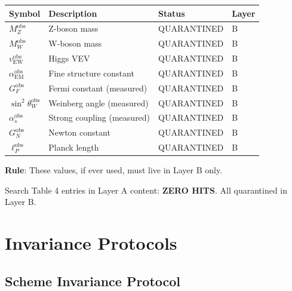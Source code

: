\documentclass[11pt,a4paper]{article}
\begin{document}
\begin{forbiddenbox}
\label{box:table-external}
\begin{center}
\begin{tabular}{llll}
\toprule
\textbf{Symbol} & \textbf{Description} & \textbf{Status} & \textbf{Layer} \\
\midrule
$M_Z^{\text{obs}}$ & Z-boson mass & QUARANTINED & B \\
$M_W^{\text{obs}}$ & W-boson mass & QUARANTINED & B \\
$v_{\text{EW}}^{\text{obs}}$ & Higgs VEV & QUARANTINED & B \\
$\alpha_{\text{EM}}^{\text{obs}}$ & Fine structure constant & QUARANTINED & B \\
$G_F^{\text{obs}}$ & Fermi constant (measured) & QUARANTINED & B \\
$\sin^2\theta_W^{\text{obs}}$ & Weinberg angle (measured) & QUARANTINED & B \\
$\alpha_s^{\text{obs}}$ & Strong coupling (measured) & QUARANTINED & B \\
$G_N^{\text{obs}}$ & Newton constant & QUARANTINED & B \\
$\ell_P^{\text{obs}}$ & Planck length & QUARANTINED & B \\
\bottomrule
\end{tabular}
\end{center}
\textbf{Rule}: These values, if ever used, must live in Layer B only.
\end{forbiddenbox}

\begin{trapbox}
\label{trap:rt14}
Search Table 4 entries in Layer A content: \textbf{ZERO HITS}. All quarantined in Layer B.
\end{trapbox}

\appendix
\section{Invariance Protocols}
\label{app:invariance}

\subsection{Scheme Invariance Protocol}
\label{app:scheme-inv}
\end{document}
